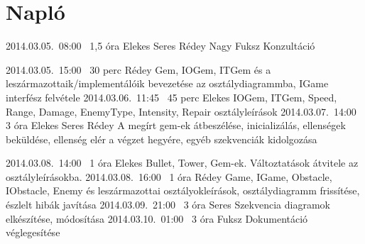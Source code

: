 %
\section{Napló}

\begin{naplo}


\bejegyzes
{2014.03.05.~08:00~}
{1,5 óra}
{Elekes\newline
Seres\newline
Rédey\newline
Nagy\newline
Fuksz}
{Konzultáció}

\bejegyzes
{2014.03.05.~15:00~}
{30 perc}
{Rédey}
{Gem, IOGem, ITGem és a leszármazottaik/implementálóik bevezetése az osztálydiagrammba, IGame interfész felvétele}
\bejegyzes
{2014.03.06.~11:45~}
{45 perc}
{Elekes}
{IOGem, ITGem, Speed, Range, Damage, EnemyType, Intensity, Repair osztályleírások}
\bejegyzes
{2014.03.07.~14:00~}
{3 óra}
{Elekes\newline
Seres\newline
Rédey}
{A megírt gem-ek átbeszélése, inicializálás, ellenségek beküldése, ellenség elér a végzet hegyére, egyéb szekvenciák kidolgozása}

\bejegyzes
{2014.03.08.~14:00~}
{1 óra}
{Elekes}
{Bullet, Tower, Gem-ek.
Változtatások átvitele az osztályleírásokba. }
\bejegyzes
{2014.03.08.~16:00~}
{1 óra}
{Rédey}
{Game, IGame, Obstacle, IObstacle, Enemy és leszármazottai osztályokleírások, osztálydiagramm frissítése, észlelt hibák javítása}
\bejegyzes
{2014.03.09.~21:00~}
{3 óra}
{Seres}
{Szekvencia diagramok elkészítése, módosítása}
\bejegyzes
{2014.03.10.~01:00~}
{3 óra}
{Fuksz}
{Dokumentáció véglegesítése}

			

\end{naplo}

